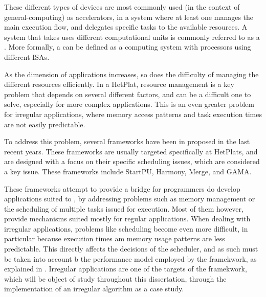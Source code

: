 \documentclass[main.tex]{subfiles}
\begin{document}
These different types of devices are most commonly used (in the context of general-computing) as accelerators, in a system where at least one \cpu manages the main execution flow, and delegates specific tasks to the available resources. A system that takes uses different computational units is commonly referred to as a \hetplat. More formally, a \hetplat can be defined as a computing system with processors using different \acp{ISA}.

As the dimension of applications increases, so does the difficulty of managing the different resources efficiently. In a \ac{HetPlat}, resource management is a key problem that depends on several different factors, and can be a difficult one to solve, especially for more complex applications. This is an even greater problem for irregular applications, where memory access patterns and task execution times are not easily predictable.

To address this problem, several frameworks have been in proposed in the last recent years. These frameworks are usually targeted specifically at \acp{HetPlat}, and are designed with a focus on their specific scheduling issues, which are considered a key issue. These frameworks include StartPU, Harmony, Merge, and GAMA.  

These frameworks attempt to provide a bridge for programmers do develop applications suited to \hetplat, by addressing problems such as memory management or the scheduling of multiple tasks issued for execution. Most of them however, provide mechanisms suited mostly for regular applications. When dealing with irregular applications, problems like scheduling become even more difficult, in particular because execution times am memory usage patterns are less predictable. This directly affects the decisions of the scheduler, and as such must be taken into account b the performance model employed by the framekwork, as explained in . Irregular applications are one of the targets of the \gama framekwork, which will be object of study throughout this dissertation, through the implementation of an irregular algorithm as a case study.
\end{document}
